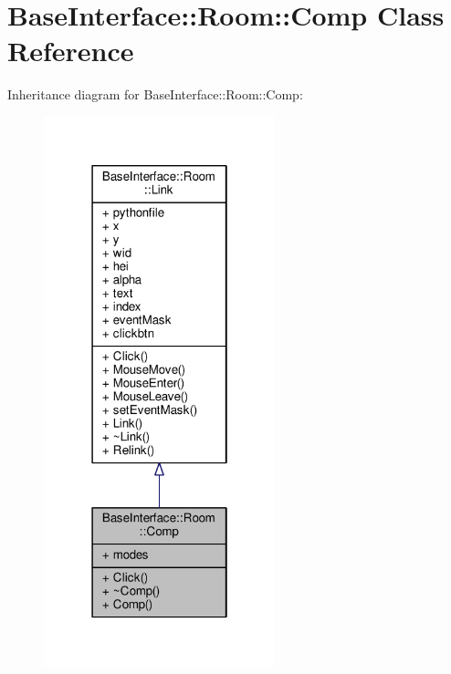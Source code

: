 \hypertarget{classBaseInterface_1_1Room_1_1Comp}{}\section{Base\+Interface\+:\+:Room\+:\+:Comp Class Reference}
\label{classBaseInterface_1_1Room_1_1Comp}


Inheritance diagram for Base\+Interface\+:\+:Room\+:\+:Comp\+:
\nopagebreak
\begin{figure}[H]
\begin{center}
\leavevmode
\includegraphics[width=190pt]{d4/d9f/classBaseInterface_1_1Room_1_1Comp__inherit__graph}
\end{center}
\end{figure}


